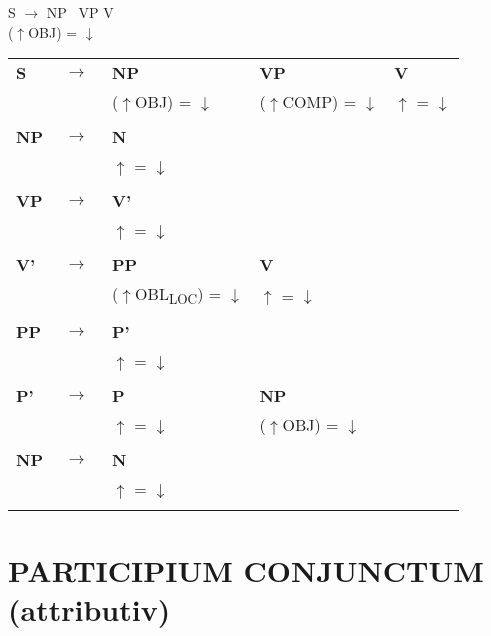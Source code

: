 \documentclass[12pt,a4paper]{article}
\begin{document}
S $\rightarrow$ NP \, VP \: V\\

($\uparrow$OBJ) = $\downarrow$\\

\renewcommand{\arraystretch}{1}  
\begin{tabular}{ l  l  l  l  l }
  \textbf{S} & $\rightarrow$ & \: \: \textbf{NP} & \: \: \: \textbf{VP} & \: \textbf{V}\\
   & $\qquad$ &($\uparrow$OBJ) = $\downarrow$ & ($\uparrow$COMP) = $\downarrow$ & $\uparrow$ = $\downarrow$\\
   $\qquad$ & $\qquad$ \\
    \textbf{NP} & $\rightarrow$ & \: \textbf{N} \\
   & $\qquad$ & $\uparrow$ = $\downarrow$\\
      $\qquad$ & $\qquad$ \\
    \textbf{VP} & $\rightarrow$ & \: \textbf{V'} \\
   & $\qquad$ & $\uparrow$ = $\downarrow$\\
   $\qquad$ & $\qquad$ \\
    \textbf{V'} & $\rightarrow$ & \: \: \textbf{PP} & \: \: \: \textbf{V} & \\
   & $\qquad$ &($\uparrow$OBL\textsubscript{LOC}) = $\downarrow$  & $\uparrow$ = $\downarrow$\\
   $\qquad$ & $\qquad$ \\
    \textbf{PP} & $\rightarrow$ & \: \: \textbf{P'} \\
	& $\qquad$   & $\uparrow$ = $\downarrow$\\
   $\qquad$ & $\qquad$ \\
    \textbf{P'} & $\rightarrow$ & \: \: \textbf{P} & \: \: \textbf{NP} \\
   & $\qquad$ & $\uparrow$ = $\downarrow$ & ($\uparrow$OBJ) = $\downarrow$ \\
   $\qquad$ & $\qquad$ \\
    \textbf{NP} & $\rightarrow$ & \: \textbf{N} \\
   & $\qquad$ & $\uparrow$ = $\downarrow$\\
      $\qquad$ & $\qquad$ \\     
\end{tabular} 
 
 

\newpage
\section{PARTICIPIUM CONJUNCTUM (attributiv)}
\end{document}
